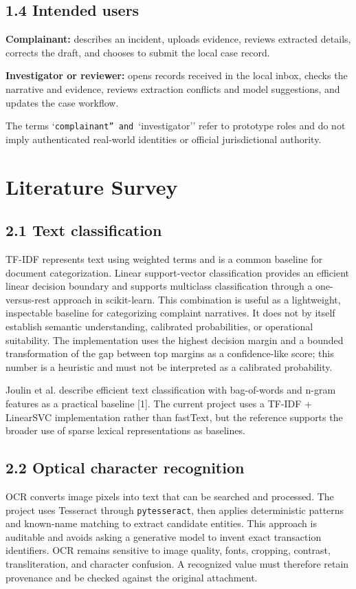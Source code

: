 \documentclass[12pt,a4paper,oneside]{report}
\begin{document}
\section{1.4 Intended users}
\textbf{Complainant:} describes an incident, uploads evidence, reviews extracted details, corrects the draft, and chooses to submit the local case record.

\textbf{Investigator or reviewer:} opens records received in the local inbox, checks the narrative and evidence, reviews extraction conflicts and model suggestions, and updates the case workflow.

The terms `\texttt{complainant'' and }`investigator'' refer to prototype roles and do not imply authenticated real-world identities or official jurisdictional authority.

\clearpage\chapter{Literature Survey}
\section{2.1 Text classification}
TF-IDF represents text using weighted terms and is a common baseline for document categorization. Linear support-vector classification provides an efficient linear decision boundary and supports multiclass classification through a one-versus-rest approach in scikit-learn. This combination is useful as a lightweight, inspectable baseline for categorizing complaint narratives. It does not by itself establish semantic understanding, calibrated probabilities, or operational suitability. The implementation uses the highest decision margin and a bounded transformation of the gap between top margins as a confidence-like score; this number is a heuristic and must not be interpreted as a calibrated probability.

Joulin et al. describe efficient text classification with bag-of-words and n-gram features as a practical baseline [1]. The current project uses a TF-IDF + LinearSVC implementation rather than fastText, but the reference supports the broader use of sparse lexical representations as baselines.

\section{2.2 Optical character recognition}
OCR converts image pixels into text that can be searched and processed. The project uses Tesseract through \texttt{pytesseract}, then applies deterministic patterns and known-name matching to extract candidate entities. This approach is auditable and avoids asking a generative model to invent exact transaction identifiers. OCR remains sensitive to image quality, fonts, cropping, contrast, transliteration, and character confusion. A recognized value must therefore retain provenance and be checked against the original attachment.
\end{document}
